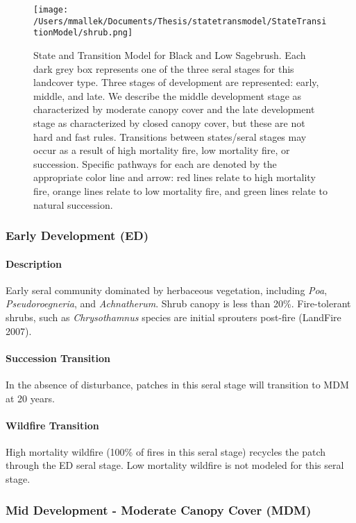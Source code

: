 \begin{figure}[htbp]
\centering
\texttt{[image: /Users/mmallek/Documents/Thesis/statetransmodel/StateTransitionModel/shrub.png]}
\caption{State and Transition Model for Black and Low Sagebrush. Each dark grey box represents one of the three seral stages for this landcover type. Three stages of development are represented: early, middle, and late. We describe the middle development stage as characterized by moderate canopy cover and the late development stage as characterized by closed canopy cover, but these are not hard and fast rules. Transitions between states/seral stages may occur as a result of high mortality fire, low mortality fire, or succession. Specific pathways for each are denoted by the appropriate color line and arrow: red lines relate to high mortality fire, orange lines relate to low mortality fire, and green lines relate to natural succession.} 
\label{lsg_transmodel}
\end{figure}

\subsubsection{Early Development (ED)} 

\paragraph{Description} Early seral community dominated by herbaceous vegetation, including \emph{Poa}, \emph{Pseudoroegneria}, and \emph{Achnatherum}. Shrub canopy is less than 20\%. Fire-tolerant shrubs, such as \emph{Chrysothamnus} species are initial sprouters post-fire (LandFire 2007).

\paragraph{Succession Transition} In the absence of disturbance, patches in this seral stage will transition to MDM at 20 years. 

\paragraph{Wildfire Transition} High mortality wildfire (100\% of fires in this seral stage) recycles the patch through the ED seral stage. Low mortality wildfire is not modeled for this seral stage.

\noindent\hrulefill


\subsubsection{Mid Development - Moderate Canopy Cover (MDM)}

